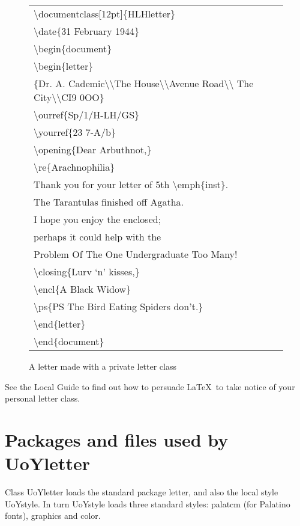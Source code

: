 \documentclass[12pt,a4paper]{article}
\newcommand{\cmdsty}[1]{\textsf{#1}}
\newcommand{\cmd}[1]{\cmdsty{\textbackslash#1}}
\newcommand{\pcmd}[2]{\cmdsty{\cmd{#1}$\{$#2$\}$}}
\newcommand{\nl}{\textbackslash\textbackslash}
\begin{document}
\begin{figure}
{\sffamily
\begin{tabular}[t]{l}
\pcmd{documentclass[12pt]}{HLHletter}\\
\pcmd{date}{31 February 1944}\\[1ex]
\pcmd{begin}{document}\\
\pcmd{begin}{letter}\\
\hspace*{1cm}   $\{$Dr. A. Cademic\nl The House\nl Avenue Road\nl
                The City\nl CI9 0OO$\}$\\
\pcmd{ourref}{Sp/1/H-LH/GS}\\
\pcmd{yourref}{23 7-A/b}\\
\pcmd{opening}{Dear Arbuthnot,}\\
\pcmd{re}{Arachnophilia}\\
Thank you for your letter of 5th \pcmd{emph}{inst}.\\
The Tarantulas finished off Agatha.\\
I hope you enjoy the enclosed;\\
perhaps it could help with the\\
Problem Of The One Undergraduate Too Many!\\
\pcmd{closing}{Lurv `n' kisses,}\\
\pcmd{encl}{A Black Widow}\\
\pcmd{ps}{PS The Bird Eating Spiders don't.}\\
\pcmd{end}{letter}\\
\pcmd{end}{document}
\end{tabular}
}
\caption{A letter made with a private letter class}\label{ExampleInpTwo:Fig}
\end{figure}

See the Local Guide to find out how to persuade \LaTeX\ to take notice
of your personal letter class.

\section{Packages and files used by \cmdsty{UoYletter}}

Class \cmdsty{UoYletter} loads the standard package \cmdsty{letter},
and also the local style \cmdsty{UoYstyle}.  In turn \cmdsty{UoYstyle}
loads three standard styles: \cmdsty{palatcm} (for Palatino fonts),
\cmdsty{graphics} and \cmdsty{color}.


 
\end{document}
